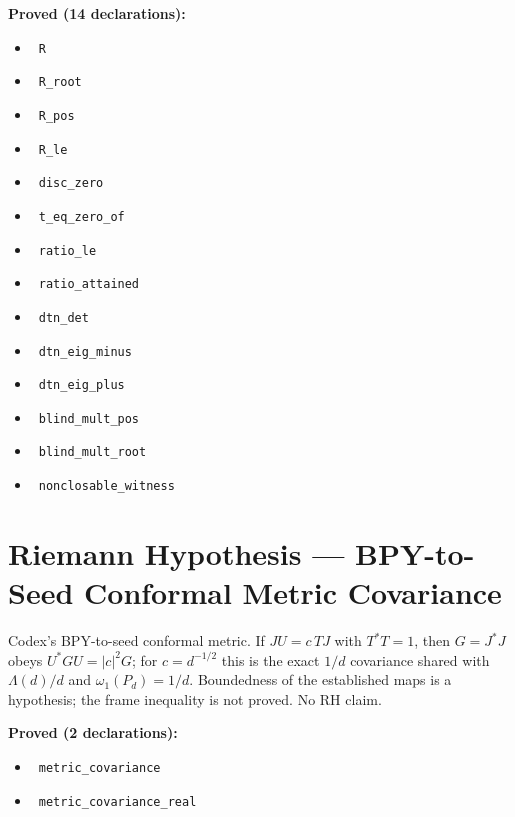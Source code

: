 \documentclass{report}
\theoremstyle{definition}
\begin{document}
\noindent\textbf{Proved (14 declarations):}
\begin{itemize}
  \item {}\leanok\ \texttt{R}
  \item {}\leanok\ \texttt{R\_root}
  \item {}\leanok\ \texttt{R\_pos}
  \item {}\leanok\ \texttt{R\_le}
  \item {}\leanok\ \texttt{disc\_zero}
  \item {}\leanok\ \texttt{t\_eq\_zero\_of}
  \item {}\leanok\ \texttt{ratio\_le}
  \item {}\leanok\ \texttt{ratio\_attained}
  \item {}\leanok\ \texttt{dtn\_det}
  \item {}\leanok\ \texttt{dtn\_eig\_minus}
  \item {}\leanok\ \texttt{dtn\_eig\_plus}
  \item {}\leanok\ \texttt{blind\_mult\_pos}
  \item {}\leanok\ \texttt{blind\_mult\_root}
  \item {}\leanok\ \texttt{nonclosable\_witness}
\end{itemize}

\section{Riemann Hypothesis --- BPY-to-Seed Conformal Metric Covariance}
Codex's BPY-to-seed conformal metric. If $JU=c\,TJ$ with $T^*T=1$, then $G=J^*J$ obeys $U^*GU=|c|^2G$; for $c=d^{-1/2}$ this is the exact $1/d$ covariance shared with $\Lambda(d)/d$ and $\omega_1(P_d)=1/d$. Boundedness of the established maps is a hypothesis; the frame inequality is not proved. No RH claim.

\noindent\textbf{Proved (2 declarations):}
\begin{itemize}
  \item {}\leanok\ \texttt{metric\_covariance}
  \item {}\leanok\ \texttt{metric\_covariance\_real}
\end{itemize}
\end{document}
